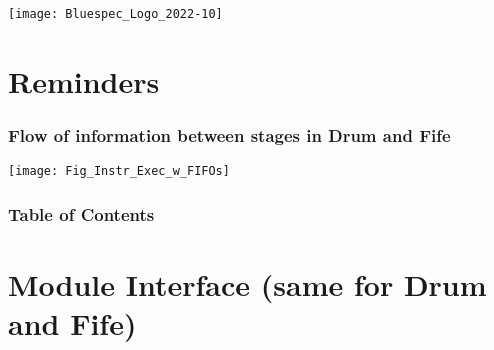 


\date{L16: RISC-V: The Fife pipelined CPU}





\begin{frame}
\titlepage

\begin{center}
 \texttt{[image: Bluespec\_Logo\_2022-10]}
\end{center}

\end{frame}


\section{Reminders}




\begin{frame}
\frametitle{Flow of information between stages in Drum and Fife}

\label{Slide_Instr_Steps}

\footnotesize

\begin{center}
 \texttt{[image: Fig\_Instr\_Exec\_w\_FIFOs]}
\end{center}

\end{frame}


\begin{frame}
\frametitle{Table of Contents}

\tableofcontents

\end{frame}


\section{Module Interface (same for Drum and Fife)}

